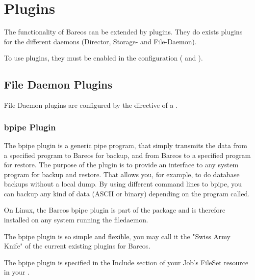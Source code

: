\chapter{Plugins}

The functionality of Bareos can be extended by plugins.
They do exists plugins for the different daemons (Director, Storage- and File-Daemon).

To use plugins, they must be enabled in the configuration ( and ).



\section{File Daemon Plugins}
\label{fdPlugins}

File Daemon plugins are configured by the  directive of a .


\subsection{bpipe Plugin}
\label{bpipe}

The bpipe plugin is a generic pipe program, that simply transmits the data from a specified program to Bareos for backup, and
from Bareos to a specified program for restore. The purpose of the plugin is to provide an interface to any system program
for backup and restore. That allows you, for example, to do database backups without a local dump. By using different command 
lines to bpipe, you can backup any kind of data (ASCII or binary) depending on the program called.

On Linux, the Bareos bpipe plugin is part of the  package and is therefore installed on any system running the filedaemon.

The bpipe plugin is so simple and flexible, you may call it the 
"Swiss Army Knife" of the current existing plugins for Bareos.

The bpipe plugin is specified in the Include section of your Job's FileSet resource in your .

